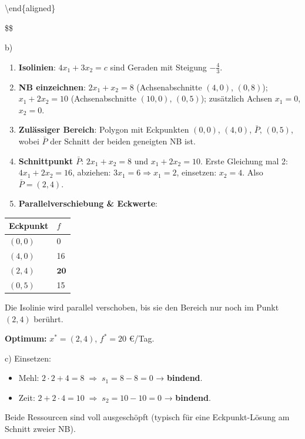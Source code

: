 \documentclass[11pt, a4paper]{article}
\begin{document}
\textbackslash{}end\{aligned\}

\$\$


b)

\begin{enumerate}
  \item \textbf{Isolinien}: $4x_1 + 3x_2 = c$ sind Geraden mit Steigung $-\tfrac{4}{3}$.
  \item \textbf{NB einzeichnen}: $2x_1 + x_2 = 8$ (Achsenabschnitte $(4,0)$, $(0,8)$); $x_1 + 2x_2 = 10$ (Achsenabschnitte $(10,0)$, $(0,5)$); zusätzlich Achsen $x_1=0$, $x_2=0$.
  \item \textbf{Zulässiger Bereich}: Polygon mit Eckpunkten $(0,0)$, $(4,0)$, $\bar P$, $(0,5)$, wobei $\bar P$ der Schnitt der beiden geneigten NB ist.
  \item \textbf{Schnittpunkt $\bar P$}: $2x_1 + x_2 = 8$ und $x_1 + 2x_2 = 10$. Erste Gleichung mal 2: $4x_1 + 2x_2 = 16$, abziehen: $3x_1 = 6 \Rightarrow x_1 = 2$, einsetzen: $x_2 = 4$. Also $\bar P = (2,4)$.
  \item \textbf{Parallelverschiebung \& Eckwerte}:
\end{enumerate}


{\small
\begin{tabularx}{\linewidth}{XX}
\hline
\rowcolor{tableheadbg}
{\color{white}\textbf{Eckpunkt}} & {\color{white}\textbf{$f$}} \\[2pt]
\hline
\endhead
\hline
\endfoot
$(0,0)$ & 0 \\
$(4,0)$ & 16 \\
$(2,4)$ & $\mathbf{20}$ \\
$(0,5)$ & 15 \\
\end{tabularx}
}


Die Isolinie wird parallel verschoben, bis sie den Bereich nur noch im Punkt $(2,4)$ berührt.


\textbf{Optimum:} $x^* = (2, 4)$, $f^* = 20$ €/Tag.


c) Einsetzen:

\begin{itemize}
  \item Mehl: $2\cdot 2 + 4 = 8 \;\Rightarrow\; s_1 = 8 - 8 = 0$ → \textbf{bindend}.
  \item Zeit: $2 + 2\cdot 4 = 10 \;\Rightarrow\; s_2 = 10 - 10 = 0$ → \textbf{bindend}.
\end{itemize}

Beide Ressourcen sind voll ausgeschöpft (typisch für eine Eckpunkt-Lösung am Schnitt zweier NB).
\end{document}
